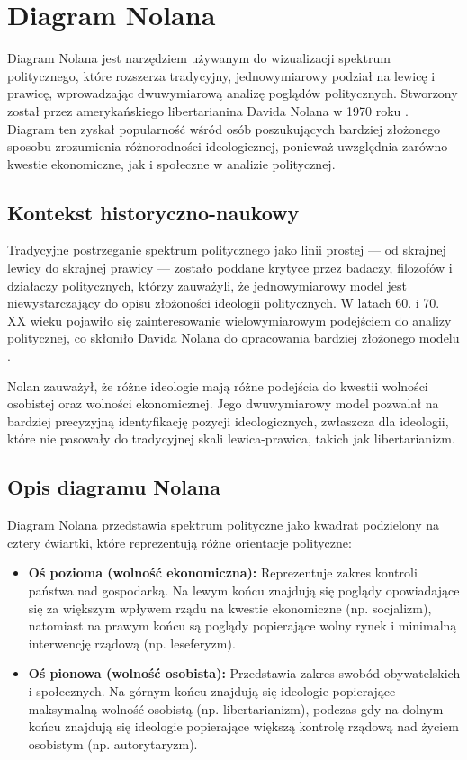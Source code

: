 \section{Diagram Nolana}
Diagram Nolana jest narzędziem używanym do wizualizacji spektrum politycznego, które rozszerza tradycyjny, jednowymiarowy podział na lewicę i prawicę, wprowadzając dwuwymiarową analizę poglądów politycznych.
Stworzony został przez amerykańskiego libertarianina Davida Nolana w 1970 roku \cite{Nolan1971}.
\\ Diagram ten zyskał popularność wśród osób poszukujących bardziej złożonego sposobu zrozumienia różnorodności ideologicznej, ponieważ uwzględnia zarówno kwestie ekonomiczne, jak i społeczne w analizie politycznej.

\subsection{Kontekst historyczno-naukowy}
Tradycyjne postrzeganie spektrum politycznego jako linii prostej — od skrajnej lewicy do skrajnej prawicy — zostało poddane krytyce przez badaczy, filozofów i działaczy politycznych,
którzy zauważyli, że jednowymiarowy model jest niewystarczający do opisu złożoności ideologii politycznych.
W latach 60. i 70. XX wieku pojawiło się zainteresowanie wielowymiarowym podejściem do analizy politycznej, co skłoniło Davida Nolana do opracowania bardziej złożonego modelu \cite{Nolan1971}.

Nolan zauważył, że różne ideologie mają różne podejścia do kwestii wolności osobistej oraz wolności ekonomicznej.
Jego dwuwymiarowy model pozwalał na bardziej precyzyjną identyfikację pozycji ideologicznych, zwłaszcza dla ideologii, które nie pasowały do tradycyjnej skali lewica-prawica, takich jak libertarianizm.

\subsection{Opis diagramu Nolana}
Diagram Nolana przedstawia spektrum polityczne jako kwadrat podzielony na cztery ćwiartki, które reprezentują różne orientacje polityczne:

\begin{itemize}
      \item \textbf{Oś pozioma (wolność ekonomiczna):} Reprezentuje zakres kontroli państwa nad gospodarką.
            Na lewym końcu znajdują się poglądy opowiadające się za większym wpływem rządu na kwestie ekonomiczne (np. socjalizm),
            natomiast na prawym końcu są poglądy popierające wolny rynek i minimalną interwencję rządową (np. leseferyzm).
      \item \textbf{Oś pionowa (wolność osobista):} Przedstawia zakres swobód obywatelskich i społecznych.
            Na górnym końcu znajdują się ideologie popierające maksymalną wolność osobistą (np. libertarianizm),
            podczas gdy na dolnym końcu znajdują się ideologie popierające większą kontrolę rządową nad życiem osobistym (np. autorytaryzm).
\end{itemize}


